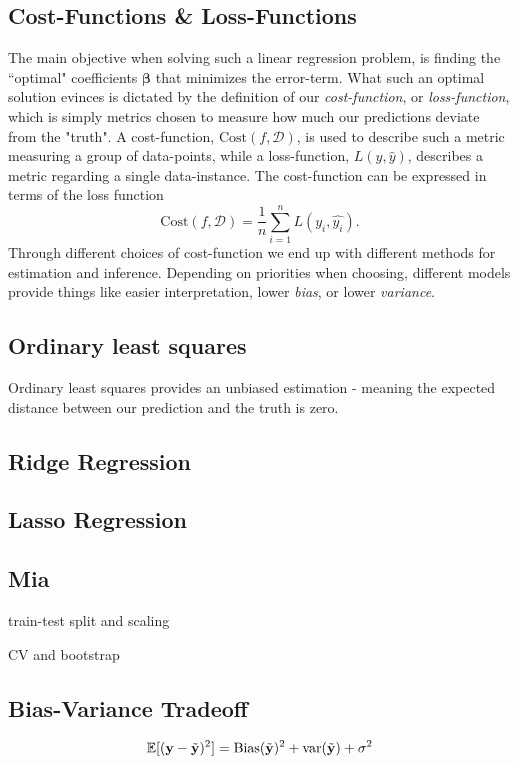 \subsection{Cost-Functions \& Loss-Functions}
The main objective when solving such a linear regression problem, is finding the ``optimal" coefficients $\boldsymbol{\beta}$ that minimizes the error-term. 
What such an optimal solution evinces is dictated by the definition of our \textit{cost-function},  or \textit{loss-function}, which is simply metrics chosen to measure how much our predictions deviate from the "truth". 
A cost-function, $\text{Cost}(f,\mathcal{D} )$, is used to describe such a metric measuring a group of data-points, while a loss-function, $L(y, \hat{y})$, describes a metric regarding a single data-instance. 
The cost-function can be expressed in terms of the loss function
\begin{equation}
\text{Cost}(f,\mathcal{D}) = \frac{1}{n}\sum_{i=1}^n L(y_i, \hat{y_i}).
\end{equation}
Through different choices of cost-function we end up with different methods for estimation and inference. 
Depending on priorities when choosing, different models provide things like easier interpretation, lower \textit{bias}, or lower \textit{variance}.



\subsection{Ordinary least squares}
Ordinary least squares provides an unbiased estimation - meaning the expected distance between our prediction and the truth is zero. 

\subsection{Ridge Regression}

\subsection{Lasso Regression}

\subsection{Mia}
train-test split and scaling

CV and bootstrap 

\subsection{Bias-Variance Tradeoff}


\begin{equation}\label{biasvar}
    \mathbb{E}[(\mathbf{y} - \Tilde{\mathbf{y}})^2] = \text{Bias}(\Tilde{\mathbf{y}})^2 + \text{var}(\Tilde{\mathbf{y}}) + \sigma^2
\end{equation}





